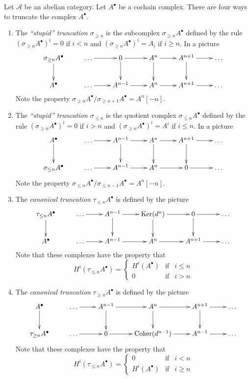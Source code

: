 \medskip\noindent
Let $\mathcal{A}$ be an abelian category.
Let $A^\bullet$ be a cochain complex. There
are four ways to truncate the complex $A^\bullet$.
\begin{enumerate}
\item The {\it ``stupid'' truncation $\sigma_{\geq n}$} is the subcomplex
$\sigma_{\geq n} A^\bullet$ defined by the rule
$(\sigma_{\geq n} A^\bullet)^i = 0$ if
$i < n$ and $(\sigma_{\geq n} A^\bullet)^i = A_i$ if
$i \geq n$. In a picture
$$
\xymatrix{
\sigma_{\geq n}A^\bullet \ar[d]  &
\ldots \ar[r] &
0 \ar[r] \ar[d] &
A^n \ar[r] \ar[d] &
A^{n + 1} \ar[r] \ar[d] &
\ldots \\
A^\bullet  &
\ldots \ar[r] &
A^{n - 1} \ar[r] &
A^n \ar[r] &
A^{n + 1} \ar[r] &
\ldots
}
$$
Note the property
$\sigma_{\geq n}A^\bullet / \sigma_{\geq n + 1}A^\bullet
= A^n[-n]$.
\item The {\it ``stupid'' truncation $\sigma_{\leq n}$}
is the quotient complex $\sigma_{\leq n} A^\bullet$ defined
by the rule $(\sigma_{\geq n} A^\bullet)^i = 0$ if
$i > n$ and $(\sigma_{\geq n} A^\bullet)^i = A^i$ if
$i \leq n$. In a picture
$$
\xymatrix{
A^\bullet \ar[d]  &
\ldots \ar[r] &
A^{n - 1} \ar[r] \ar[d] &
A^n \ar[r] \ar[d] &
A^{n + 1} \ar[r] \ar[d] &
\ldots \\
\sigma_{\leq n}A^\bullet &
\ldots \ar[r] &
A^{n - 1} \ar[r] &
A^n \ar[r] &
0 \ar[r] &
\ldots \\
}
$$
Note the property
$\sigma_{\leq n}A^\bullet / \sigma_{\leq n - 1}A^\bullet = A^n[-n]$.
\item The {\it canonical truncation} $\tau_{\leq n}A^\bullet$
is defined by the picture
$$
\xymatrix{
\tau_{\leq n}A^\bullet \ar[d]  &
\ldots \ar[r] &
A^{n - 1} \ar[r] \ar[d] &
\text{Ker}(d^n) \ar[r] \ar[d] &
0 \ar[r] \ar[d] &
\ldots \\
A^\bullet  &
\ldots \ar[r] &
A^{n - 1} \ar[r] &
A^n \ar[r] &
A^{n + 1} \ar[r] &
\ldots
}
$$
Note that these complexes have the property that
$$
H^i(\tau_{\leq n}A^\bullet) =
\left\{
\begin{matrix}
H^i(A^\bullet) & \text{if} & i \leq n \\
0 & \text{if} & i > n
\end{matrix}
\right.
$$
\item The {\it canonical truncation} $\tau_{\geq n}A^\bullet$
is defined by the picture
$$
\xymatrix{
A^\bullet \ar[d] &
\ldots \ar[r] &
A^{n - 1} \ar[r] \ar[d] &
A^n \ar[r] \ar[d] &
A^{n + 1} \ar[r] \ar[d] &
\ldots \\
\tau_{\geq n}A^\bullet &
\ldots \ar[r] &
0 \ar[r] &
\text{Coker}(d^{n - 1}) \ar[r] &
A^{n - 1} \ar[r] &
\ldots
}
$$
Note that these complexes have the property that
$$
H^i(\tau_{\leq n}A^\bullet) =
\left\{
\begin{matrix}
0 & \text{if} & i < n \\
H^i(A^\bullet) & \text{if} & i \geq n
\end{matrix}
\right.
$$
\end{enumerate}
